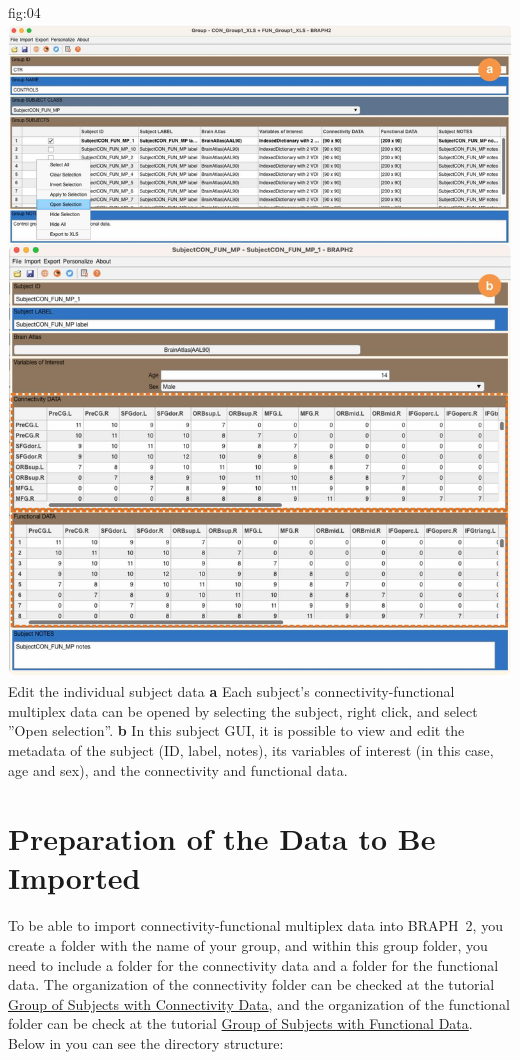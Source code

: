 \documentclass[justified]{tufte-handout}
\begin{document}
	{fig:04}
	{\includegraphics{fig04.jpg}
	}
	{Edit the individual subject data}
	{
	{\bf a}  Each subject's connectivity-functional multiplex data can be opened by selecting the subject, right click, and select ''Open selection''. 
	{\bf b} In this subject GUI, it is possible to view and edit the metadata of the subject (ID, label, notes), its variables of interest (in this case, age and sex), and the connectivity and functional data. 
	}


\clearpage
\section{Preparation of the Data to Be Imported}

To be able to import connectivity-functional multiplex data into BRAPH~2, you create a folder with the name of your group, and within this group folder, you need to include a folder for the connectivity data and a folder for the functional data. The organization of the connectivity folder can be checked at the tutorial \href{https://github.com/braph-software/BRAPH-2/tree/develop/tutorials/data/tut_gr_con}{Group of Subjects with Connectivity Data}, and the organization of the functional folder can be check at the tutorial \href{https://github.com/braph-software/BRAPH-2/tree/develop/tutorials/data/tut_gr_fun}{Group of Subjects with Functional Data}. Below in  you can see the directory structure:
\end{document}
